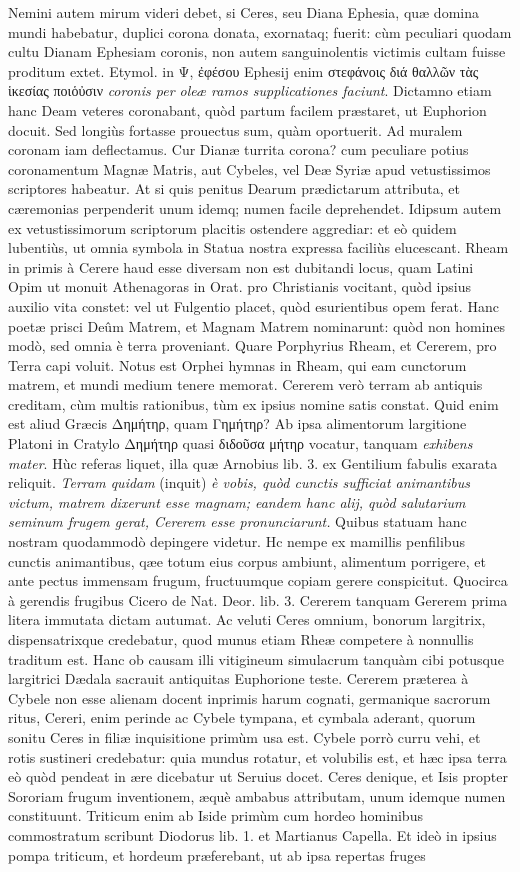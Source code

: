 \documentclass[a4paper, 11pt, oneside, polutonikogreek, latin]{article}
\begin{document}
Nemini autem mirum videri debet, si Ceres, seu Diana Ephesia, quæ domina mundi habebatur, duplici corona donata, exornataq; fuerit: cùm peculiari quodam cultu Dianam Ephesiam coronis, non autem sanguinolentis victimis cultam fuisse proditum extet. Etymol. in Ψ, ἐφέσου Ephesij enim στεφάνοις διά θαλλῶν τὰς ἱκεσίας ποιὁὐσιν \emph{coronis per oleæ ramos supplicationes faciunt}. Dictamno etiam hanc Deam veteres coronabant, quòd partum facilem præstaret, ut Euphorion docuit. Sed longiùs fortasse prouectus sum, quàm oportuerit. Ad muralem coronam iam deflectamus. Cur Dianæ turrita corona? cum peculiare potius coronamentum Magnæ Matris, aut Cybeles, vel Deæ Syriæ apud vetustissimos scriptores habeatur. At si quis penitus Dearum prædictarum attributa, et cæremonias perpenderit unum idemq; numen facile deprehendet. Idipsum autem ex vetustissimorum scriptorum placitis ostendere aggrediar: et eò quidem lubentiùs, ut omnia symbola in Statua nostra expressa faciliùs elucescant. Rheam in primis à Cerere haud esse diversam non est dubitandi locus, quam Latini Opim ut monuit Athenagoras in Orat. pro Christianis vocitant, quòd ipsius auxilio vita constet: vel ut Fulgentio placet, quòd esurientibus opem ferat. Hanc poetæ prisci Deûm Matrem, et Magnam Matrem nominarunt: quòd non homines modò, sed omnia è terra proveniant. Quare Porphyrius Rheam, et Cererem, pro Terra capi voluit. Notus est Orphei hymnas in Rheam, qui eam cunctorum matrem, et mundi medium tenere memorat. Cererem verò terram ab antiquis creditam, cùm multis rationibus, tùm ex ipsius nomine satis constat. Quid enim est aliud Græcis Δημήτηρ, quam Γημήτηρ? Ab ipsa alimentorum largitione Platoni in Cratylo Δημήτηρ quasi διδοῦσα μήτηρ vocatur, tanquam \emph{exhibens mater}. Hùc referas liquet, illa quæ Arnobius lib. 3. ex Gentilium fabulis exarata reliquit. \emph{Terram quidam} (inquit) \emph{è vobis, quòd cunctis sufficiat animantibus victum, matrem dixerunt esse magnam; eandem hanc alij, quòd salutarium seminum frugem gerat, Cererem esse pronunciarunt.} Quibus statuam hanc nostram quodammodò depingere videtur. Hc nempe ex mamillis penfilibus cunctis animantibus, qæe totum eius corpus ambiunt, alimentum porrigere, et ante pectus immensam frugum, fructuumque copiam gerere conspicitut. Quocirca à gerendis frugibus Cicero de Nat. Deor. lib. 3. Cererem tanquam Gererem prima litera immutata dictam autumat. Ac veluti Ceres omnium, bonorum largitrix, dispensatrixque credebatur, quod munus etiam Rheæ competere à nonnullis traditum est. Hanc ob causam illi vitigineum simulacrum tanquàm cibi potusque largitrici Dædala sacrauit antiquitas Euphorione teste. Cererem præterea à Cybele non esse alienam docent inprimis harum cognati, germanique sacrorum ritus, Cereri, enim perinde ac Cybele tympana, et cymbala aderant, quorum sonitu Ceres in filiæ inquisitione primùm usa est. Cybele porrò curru vehi, et rotis sustineri credebatur: quia mundus rotatur, et volubilis est, et hæc ipsa terra eò quòd pendeat in ære dicebatur ut Seruius docet. Ceres denique, et Isis propter Sororiam frugum inventionem, æquè ambabus attributam, unum idemque numen constituunt. Triticum enim ab Iside primùm cum hordeo hominibus commostratum scribunt Diodorus lib. 1. et Martianus Capella. Et ideò in ipsius pompa triticum, et hordeum præferebant, ut ab ipsa repertas fruges 
\end{document}
